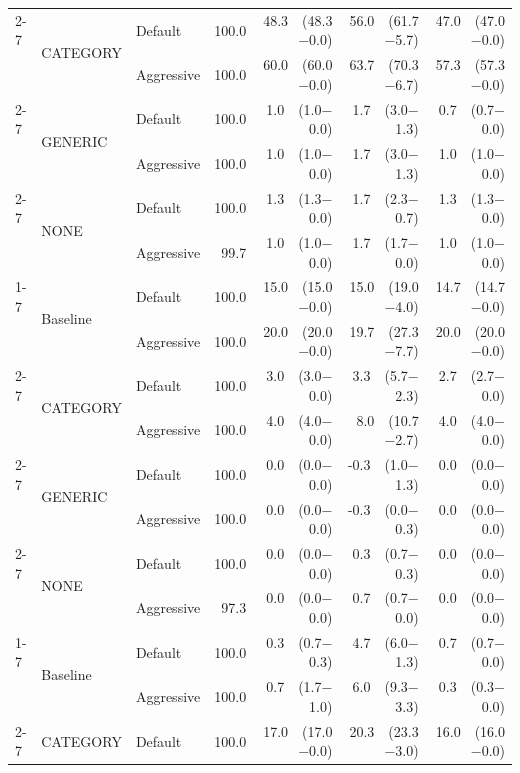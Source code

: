 \begin{table}
\begin{tabular}{lllrrrr}
\cline{2-7}
 & \multirow[t]{2}{*}{CATEGORY} & Default & 100.0 & 48.3\ \ (48.3$-$0.0) & 56.0\ \ (61.7$-$5.7) & 47.0\ \ (47.0$-$0.0) \\
 &  & Aggressive & 100.0 & 60.0\ \ (60.0$-$0.0) & 63.7\ \ (70.3$-$6.7) & 57.3\ \ (57.3$-$0.0) \\
\cline{2-7}
 & \multirow[t]{2}{*}{GENERIC} & Default & 100.0 & 1.0\ \ (1.0$-$0.0) & 1.7\ \ (3.0$-$1.3) & 0.7\ \ (0.7$-$0.0) \\
 &  & Aggressive & 100.0 & 1.0\ \ (1.0$-$0.0) & 1.7\ \ (3.0$-$1.3) & 1.0\ \ (1.0$-$0.0) \\
\cline{2-7}
 & \multirow[t]{2}{*}{NONE} & Default & 100.0 & 1.3\ \ (1.3$-$0.0) & 1.7\ \ (2.3$-$0.7) & 1.3\ \ (1.3$-$0.0) \\
 &  & Aggressive & 99.7 & 1.0\ \ (1.0$-$0.0) & 1.7\ \ (1.7$-$0.0) & 1.0\ \ (1.0$-$0.0) \\
\cline{1-7} \cline{2-7}
\multirow[t]{8}{*}{Gemini-2.0-Flash} & \multirow[t]{2}{*}{Baseline} & Default & 100.0 & 15.0\ \ (15.0$-$0.0) & 15.0\ \ (19.0$-$4.0) & 14.7\ \ (14.7$-$0.0) \\
 &  & Aggressive & 100.0 & 20.0\ \ (20.0$-$0.0) & 19.7\ \ (27.3$-$7.7) & 20.0\ \ (20.0$-$0.0) \\
\cline{2-7}
 & \multirow[t]{2}{*}{CATEGORY} & Default & 100.0 & 3.0\ \ (3.0$-$0.0) & 3.3\ \ (5.7$-$2.3) & 2.7\ \ (2.7$-$0.0) \\
 &  & Aggressive & 100.0 & 4.0\ \ (4.0$-$0.0) & 8.0\ \ (10.7$-$2.7) & 4.0\ \ (4.0$-$0.0) \\
\cline{2-7}
 & \multirow[t]{2}{*}{GENERIC} & Default & 100.0 & 0.0\ \ (0.0$-$0.0) & -0.3\ \ (1.0$-$1.3) & 0.0\ \ (0.0$-$0.0) \\
 &  & Aggressive & 100.0 & 0.0\ \ (0.0$-$0.0) & -0.3\ \ (0.0$-$0.3) & 0.0\ \ (0.0$-$0.0) \\
\cline{2-7}
 & \multirow[t]{2}{*}{NONE} & Default & 100.0 & 0.0\ \ (0.0$-$0.0) & 0.3\ \ (0.7$-$0.3) & 0.0\ \ (0.0$-$0.0) \\
 &  & Aggressive & 97.3 & 0.0\ \ (0.0$-$0.0) & 0.7\ \ (0.7$-$0.0) & 0.0\ \ (0.0$-$0.0) \\
\cline{1-7} \cline{2-7}
\multirow[t]{8}{*}{Grok-3-mini} & \multirow[t]{2}{*}{Baseline} & Default & 100.0 & 0.3\ \ (0.7$-$0.3) & 4.7\ \ (6.0$-$1.3) & 0.7\ \ (0.7$-$0.0) \\
 &  & Aggressive & 100.0 & 0.7\ \ (1.7$-$1.0) & 6.0\ \ (9.3$-$3.3) & 0.3\ \ (0.3$-$0.0) \\
\cline{2-7}
 & \multirow[t]{2}{*}{CATEGORY} & Default & 100.0 & 17.0\ \ (17.0$-$0.0) & 20.3\ \ (23.3$-$3.0) & 16.0\ \ (16.0$-$0.0) \\

\end{tabular}
\end{table}
